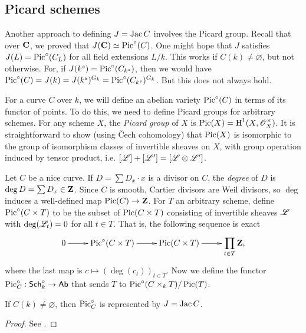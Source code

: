 \subsection{Picard schemes}\label{sec:picard-scheme}

Another approach to defining $J=\operatorname{Jac} C$ involves the Picard group. Recall 
that over $\mathbf{C}$, we proved that $J(\mathbf{C})\simeq\operatorname{Pic}^\circ(C)$. 
One might hope that $J$ satisfies $J(L)=\operatorname{Pic}^\circ(C_L)$ for all field 
extensions $L/k$. This works if $C(k)\ne\varnothing$, but not otherwise. For, 
if $J(k^s)=\operatorname{Pic}^\circ(C_{k^s})$, then we would have 
$\operatorname{Pic}^\circ(C) = J(k) = J(k^s)^{G_k} = \operatorname{Pic}^\circ(C_{k^s})^{G_k}$. But this 
does not always hold. 

For a curve $C$ over $k$, we will define an abelian variety $\operatorname{Pic}^\circ(C)$ in 
terms of its functor of points. To do this, we need to define Picard groups for 
arbitrary schemes. For any scheme $X$, the \emph{Picard group} of $X$ is 
$\operatorname{Pic}(X)=\operatorname{H}^1(X,\mathscr{O}_X^\times)$. It is straightforward to show (using \v Cech 
cohomology) that $\operatorname{Pic}(X)$ is isomorphic to the group of isomorphism classes of 
invertible sheaves on $X$, with group operation induced by tensor product, i.e. 
$[\mathscr{L}] + [\mathscr{L'}] = [\mathscr{L}\otimes \mathscr{L}']$. 

Let $C$ be a nice curve. If $D=\sum D_x\cdot x$ is a divisor on $C$, the 
\emph{degree} of $D$ is $\deg D=\sum D_x\in \mathbf{Z}$. Since $C$ is smooth, Cartier 
divisors are Weil divisors, so $\deg$ induces a well-defined map 
$\operatorname{Pic}(C)\to \mathbf{Z}$. For $T$ an arbitrary scheme, define 
$\operatorname{Pic}^\circ(C\times T)$ to be the subset of $\operatorname{Pic}(C\times T)$ consisting of 
invertible sheaves $\mathscr{L}$ with $\deg(\mathscr{L}_t)=0$ for all $t\in T$. That is, the 
following sequence is exact 
\[\xymatrix{
  0 \ar[r] 
    & \picard^\circ(C\times T) \ar[r] 
    & \picard(C\times T) \ar[r] 
    & \displaystyle\prod_{t\in T} \dZ \text{,}
}\]
where the last map is $c\mapsto (\deg(c_t))_{t\in T}$. Now we define the 
functor $\operatorname{Pic}_C^\circ:\mathsf{Sch}_k^\circ\to\mathsf{Ab}$ that sends $T$ to 
$\operatorname{Pic}^\circ(C\times_k T)/\operatorname{Pic}(T)$. 

\begin{theorem}
If $C(k)\ne \varnothing$, then $\operatorname{Pic}_C^\circ$ is represented by $J=\operatorname{Jac} C$.
\end{theorem}
\begin{proof}
See \cite[III.1.2]{mi-av}.
\end{proof}

